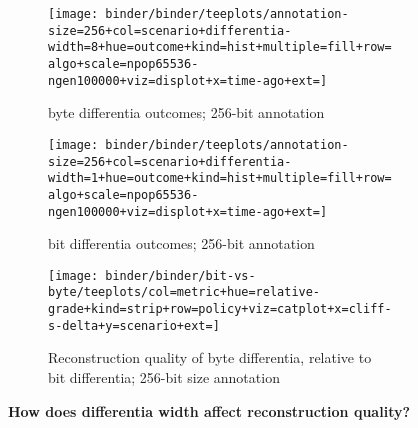 \begin{figure*}
  \centering

\begin{minipage}{\textwidth}
\begin{subfigure}[b]{0.4\textwidth}
\centering
\texttt{[image: binder/binder/teeplots/annotation-size=256+col=scenario+differentia-width=8+hue=outcome+kind=hist+multiple=fill+row=algo+scale=npop65536-ngen100000+viz=displot+x=time-ago+ext=]}
\footnotesize
\caption{byte differentia outcomes; 256-bit annotation}
  \label{fig:bit-vs-byte-summary-byte-outcomes}
  \end{subfigure}%
\begin{subfigure}[b]{0.6\textwidth}
\centering
\texttt{[image: binder/binder/teeplots/annotation-size=256+col=scenario+differentia-width=1+hue=outcome+kind=hist+multiple=fill+row=algo+scale=npop65536-ngen100000+viz=displot+x=time-ago+ext=]}
\footnotesize
\caption{bit differentia outcomes; 256-bit annotation}
\label{fig:bit-vs-byte-summary-bit-outcomes}
\end{subfigure}
\end{minipage}
  \begin{subfigure}[b]{\textwidth}
    \centering
    \texttt{[image: binder/binder/bit-vs-byte/teeplots/col=metric+hue=relative-grade+kind=strip+row=policy+viz=catplot+x=cliff-s-delta+y=scenario+ext=]}
    \footnotesize
    \caption{Reconstruction quality of byte differentia, relative to bit differentia; 256-bit size annotation}
  \label{fig:bit-vs-byte-summary-quality}
  \end{subfigure}%
\caption{%
  \textbf{How does differentia width affect reconstruction quality?}
}
\end{figure*}
